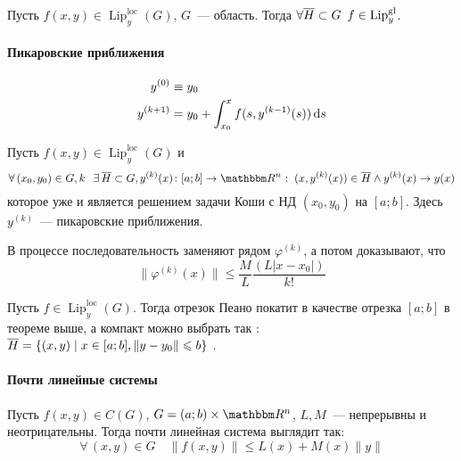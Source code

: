 \documentclass[10pt, timbord]{../notes}
\DeclareMathOperator{\Lip}{Lip}
\newcommand{\liploc}[1]{\Lip_{#1}^{\mathrm{loc}}}
\newcommand{\lipgl}[1]{\Lip_{#1}^{\mathrm{gl}}}
\newcommand*\ov[2]{
  \IfEqCase{#1}{%
    {~}{\widetilde{#2}}%
    {-}{\overline{#2}}%
    {^}{\widehat{#2}}%
  }[\PackageError{tmath}{Undefined option to ov: #1}{}]%
}
\begin{document}
\begin{lem}\label{lem:sys::lipcon}
  Пусть $f(x,y) \in \liploc{y}(G)$, $G$~--- область. Тогда $\forall \ov-{H} \subset G 
  \;\: f\in \lipgl{y}$. 
\end{lem}

\paragraph{Пикаровские приближения}
\label{par:pik}


\begin{defn}\label{defn:pik}
  \begin{align*}
    y^{(0)} &\equiv y_0 \\
    y^{(k+1)} &= y_0  + \int_{x_0}^x f(s, y^{(k-1)}(s))\, \mathrm{d} s 
  \end{align*}
\end{defn}

\begin{thrm}[Пикара]\label{thrm:pik}
  Пусть $f(x,y) \in \liploc{y}(G)$ и 
  \[
    \forall\, (x_0, y_0) \in G, k \;\:\: \exists\, \ov{-} H \subset G, y^{(k)}(x) \colon [a;b] 
    \to \R^n \:\colon \: (x, y^{(k)}(x)) \in \ov{-} H  \land y^{(k)}(x) \to y(x)
  \]
  которое уже и является решением задачи Коши с НД $(x_0, y_0)$ на $[a;b]$. Здесь $y^{(k)}$~--- пикаровские
  приближения.
\end{thrm}
\begin{ittproof}
  В процессе последовательность заменяют рядом $\varphi^{(k)}$, а потом доказывают, что 
  \[
    \|\varphi^{(k)}(x)\| \leqslant \frac{M}{L} \frac{(L|x-x_0|)}{k!}
  \]
\end{ittproof}

\begin{thrm}\label{thrm:pikex}
  Пусть $f\in \liploc{y}(G)$. Тогда отрезок Пеано покатит в качестве отрезка $[a;b]$ в теореме выше,
  а компакт можно выбрать так : $\ov{-} H = \{(x,y) \mid x\in [a;b], \|y-y_0\| \leqslant b\}$ .
\end{thrm}

\paragraph{Почти линейные системы}

\begin{defn}\label{defn:plin}
  Пусть $f(x,y) \in C(G)$, $G = (a;b) \times \R^n$, $L,M$~--- непрерывны и неотрицательны. Тогда
  почти линейная система выглядит так:
  \[
    \forall\,(x,y) \in G \quad \|f(x,y)\| \leqslant L(x) + M(x) \|y\|
  \]
\end{defn}
\end{document}
